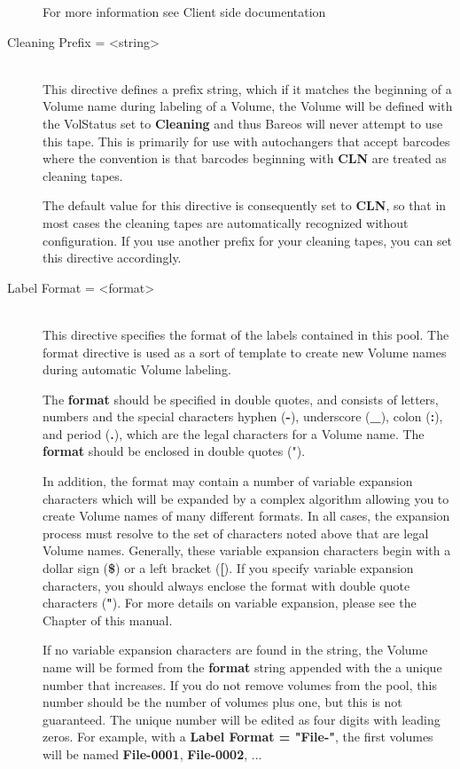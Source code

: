 \begin{description}
For more information see Client side documentation

\item [Cleaning Prefix = {\textless}string{\textgreater}] \hfill \\
This directive defines a prefix string, which if it matches the
beginning of a Volume name during labeling of a Volume, the Volume will
be defined with the VolStatus set to {\bf Cleaning} and thus Bareos will
never attempt to use this tape.  This is primarily for use with
autochangers that accept barcodes where the convention is that barcodes
beginning with {\bf CLN} are treated as cleaning tapes.

The default value for this directive is consequently set to {\bf CLN}, so
that in most cases the cleaning tapes are automatically recognized without
configuration.
If you use another prefix for your cleaning tapes, you can set this directive
accordingly.

\label{Label}
\item [Label Format = {\textless}format{\textgreater}] \hfill \\
This directive specifies the format of the labels contained in this
pool.  The format directive is used as a sort of template to create new
Volume names during automatic Volume labeling.

The {\bf format} should be specified in double quotes, and consists of
letters, numbers and the special characters hyphen ({\bf -}), underscore
({\bf \_}), colon ({\bf :}), and period ({\bf .}), which are the legal
characters for a Volume name.  The {\bf format} should be enclosed in
double quotes (").

In addition, the format may contain a number of variable expansion
characters which will be expanded by a complex algorithm allowing you to
create Volume names of many different formats.  In all cases, the
expansion process must resolve to the set of characters noted above that
are legal Volume names.  Generally, these variable expansion characters
begin with a dollar sign ({\bf \$}) or a left bracket ({\bf [}).  If you
specify variable expansion characters, you should always enclose the
format with double quote characters ({\bf "}).  For more details on
variable expansion, please see the  Chapter of this manual.

If no variable expansion characters are found in the string, the Volume
name will be formed from the {\bf format} string appended with the
a unique number that increases.  If you do not remove volumes from the
pool, this number should be the number of volumes plus one, but this
is not guaranteed. The unique number will be edited as four
digits with leading zeros.  For example, with a {\bf Label Format =
"File-"}, the first volumes will be named {\bf File-0001}, {\bf
File-0002}, ...


\end{description}
